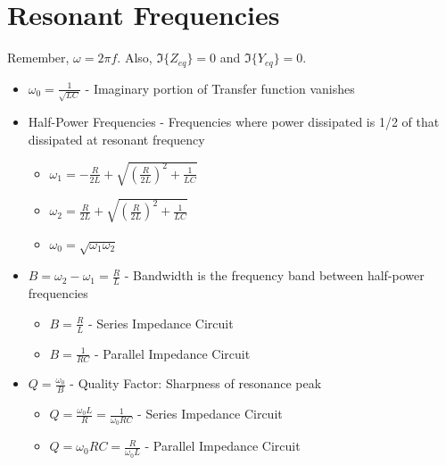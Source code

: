 \section*{Resonant Frequencies} \label{sec:Frequency Resonance}
Remember, $\omega = 2 \pi f$.
Also, $\Im \lbrace Z_{eq} \rbrace = 0$ and $\Im \lbrace Y_{eq} \rbrace = 0$.
\begin{itemize}[nolistsep]
	\item $\omega_{0} = \frac{1}{\sqrt{LC}}$ - Imaginary portion of Transfer function vanishes
	\item Half-Power Frequencies - Frequencies where power dissipated is 1/2 of that dissipated at resonant frequency
	\begin{itemize}[noitemsep]
		\item $\omega_{1} = - \frac{R}{2L} + \sqrt{\left( \frac{R}{2L} \right)^{2} + \frac{1}{LC}}$
		\item $\omega_{2} = \frac{R}{2L} + \sqrt{\left( \frac{R}{2L} \right)^{2} + \frac{1}{LC}}$
		\item $\omega_{0} = \sqrt{\omega_{1}\omega_{2}}$
	\end{itemize}
	\item $B = \omega_{2} - \omega_{1} = \frac{R}{L}$ - Bandwidth is the frequency band between half-power frequencies
	\begin{itemize}[noitemsep]
		\item $B = \frac{R}{L}$ - Series Impedance Circuit
		\item $B = \frac{1}{RC}$ - Parallel Impedance Circuit
	\end{itemize}
	\item $Q = \frac{\omega_{0}}{B}$ - Quality Factor: Sharpness of resonance peak
	\begin{itemize}[noitemsep]
		\item $Q =\frac{\omega_{0}L}{R} = \frac{1}{\omega_{0}RC}$ - Series Impedance Circuit
		\item $Q = \omega_{0}RC = \frac{R}{\omega_{0}L}$ - Parallel Impedance Circuit
	\end{itemize}
\end{itemize}
\vspace{-5mm}